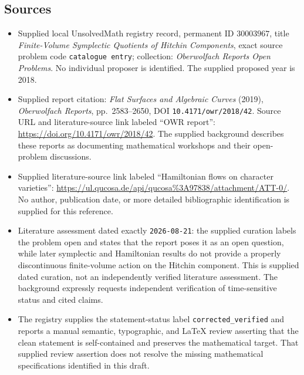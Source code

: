 \documentclass[11pt]{article}
\begin{document}
\subsection{Sources}
\begin{itemize}
\item Supplied local UnsolvedMath registry record, permanent ID \(30003967\), title \emph{Finite-Volume Symplectic Quotients of Hitchin Components}, exact source problem code \texttt{catalogue entry}; collection: \emph{Oberwolfach Reports Open Problems}. No individual proposer is identified. The supplied proposed year is 2018.
\item Supplied report citation: \emph{Flat Surfaces and Algebraic Curves} (2019), \emph{Oberwolfach Reports}, pp.\ 2583--2650, DOI \texttt{10.4171/owr/2018/42}. Source URL and literature-source link labeled ``OWR report'': \url{https://doi.org/10.4171/owr/2018/42}. The supplied background describes these reports as documenting mathematical workshops and their open-problem discussions.
\item Supplied literature-source link labeled ``Hamiltonian flows on character varieties'': \url{https://ul.qucosa.de/api/qucosa%3A97838/attachment/ATT-0/}. No author, publication date, or more detailed bibliographic identification is supplied for this reference.
\item Literature assessment dated exactly \texttt{2026-08-21}: the supplied curation labels the problem open and states that the report poses it as an open question, while later symplectic and Hamiltonian results do not provide a properly discontinuous finite-volume action on the Hitchin component. This is supplied dated curation, not an independently verified literature assessment. The background expressly requests independent verification of time-sensitive status and cited claims.
\item The registry supplies the statement-status label \texttt{corrected\_verified} and reports a manual semantic, typographic, and LaTeX review asserting that the clean statement is self-contained and preserves the mathematical target. That supplied review assertion does not resolve the missing mathematical specifications identified in this draft.
\end{itemize}
\end{document}

